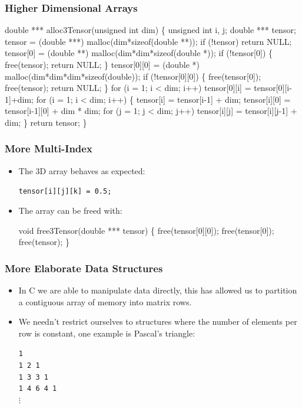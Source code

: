\documentclass[table]{beamer}
\newif\ifschigh\schighfalse
\newcommand{\kw}[1]{\ifschigh\textcolor{red}{#1}\else\textcolor{keyword}{#1}\fi}
\newcounter{sckll}
\newcommand{\kr}{\setcounter{sckll}{1}}
\newcommand{\kl}{}
\begin{document}
\begin{frame}[fragile]
\frametitle{Higher Dimensional Arrays}
\begin{semiverbatim}
\tiny
\kr\kl\kw{double} *** alloc3Tensor(\kw{unsigned int} dim)
\kl\{
\kl   \kw{unsigned int} i, j;
\kl   \kw{double} *** tensor;
\kl   tensor = (\kw{double} ***) malloc(dim*\kw{sizeof}(\kw{double} **));
\kl   \kw{if} (!tensor) \kw{return} NULL;
\kl   tensor[0] = (\kw{double} **) malloc(dim*dim*\kw{sizeof}(\kw{double} *));
\kl   \kw{if} (!tensor[0])
\kl   \{
\kl      free(tensor);
\kl      \kw{return} NULL;
\kl   \}
\kl   tensor[0][0] = (\kw{double} *) malloc(dim*dim*dim*\kw{sizeof}(\kw{double}));
\kl   \kw{if} (!tensor[0][0])
\kl   \{
\kl      free(tensor[0]); free(tensor);
\kl      \kw{return} NULL;
\kl   \}
\kl   \kw{for} (i = 1; i < dim; i++)
\kl      tensor[0][i] = tensor[0][i-1]+dim;
\kl   \kw{for} (i = 1; i < dim; i++)
\kl   \{
\kl      tensor[i] = tensor[i-1] + dim;
\kl      tensor[i][0] = tensor[i-1][0] + dim * dim;
\kl      \kw{for} (j = 1; j < dim; j++)
\kl         tensor[i][j] = tensor[i][j-1] + dim;
\kl   \}
\kl   \kw{return} tensor;
\kl\}
\end{semiverbatim}
\end{frame}

\begin{frame}[fragile]
\frametitle{More Multi-Index}
\begin{itemize}
\item The 3D array behaves as expected:\\
\begin{center}
\tt tensor[i][j][k] = 0.5;
\end{center}
\item The array can be freed with:
\begin{semiverbatim}
\kw{void} free3Tensor(\kw{double} *** tensor)
\{
   free(tensor[0][0]);
   free(tensor[0]);
   free(tensor);
\}
\end{semiverbatim}
\end{itemize}
\end{frame}

\begin{frame}
\frametitle{More Elaborate Data Structures}
\begin{itemize}
\item In C we are able to manipulate data directly, this has allowed us to partition a contiguous array of memory into matrix rows.
\item We needn't restrict ourselves to structures where the number of elements per row is constant, one example is Pascal's triangle:\\
\begin{center}
\tt1\\\tt1  2  1\\\tt1  3  3  1\\\tt1  4  6  4  1\\$\vdots$
\end{center}
\end{itemize}
\end{frame}
\end{document}
